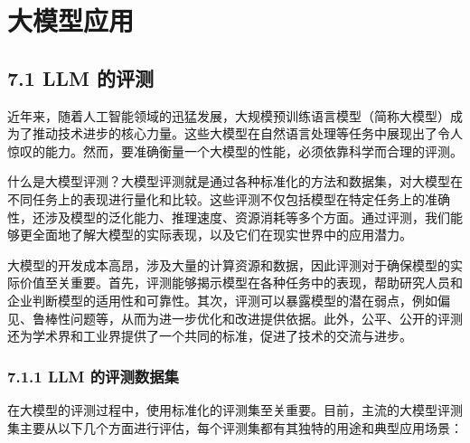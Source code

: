 \documentclass[
]{article}
\author{}
\date{}
\begin{document}
{
\setcounter{tocdepth}{3}
\tableofcontents
}
\section{大模型应用}\label{ux5927ux6a21ux578bux5e94ux7528}

\subsection{7.1 LLM 的评测}\label{llm-ux7684ux8bc4ux6d4b}

近年来，随着人工智能领域的迅猛发展，大规模预训练语言模型（简称大模型）成为了推动技术进步的核心力量。这些大模型在自然语言处理等任务中展现出了令人惊叹的能力。然而，要准确衡量一个大模型的性能，必须依靠科学而合理的评测。

什么是大模型评测？大模型评测就是通过各种标准化的方法和数据集，对大模型在不同任务上的表现进行量化和比较。这些评测不仅包括模型在特定任务上的准确性，还涉及模型的泛化能力、推理速度、资源消耗等多个方面。通过评测，我们能够更全面地了解大模型的实际表现，以及它们在现实世界中的应用潜力。

大模型的开发成本高昂，涉及大量的计算资源和数据，因此评测对于确保模型的实际价值至关重要。首先，评测能够揭示模型在各种任务中的表现，帮助研究人员和企业判断模型的适用性和可靠性。其次，评测可以暴露模型的潜在弱点，例如偏见、鲁棒性问题等，从而为进一步优化和改进提供依据。此外，公平、公开的评测还为学术界和工业界提供了一个共同的标准，促进了技术的交流与进步。

\subsubsection{7.1.1 LLM
的评测数据集}\label{llm-ux7684ux8bc4ux6d4bux6570ux636eux96c6}

在大模型的评测过程中，使用标准化的评测集至关重要。目前，主流的大模型评测集主要从以下几个方面进行评估，每个评测集都有其独特的用途和典型应用场景：
\end{document}
